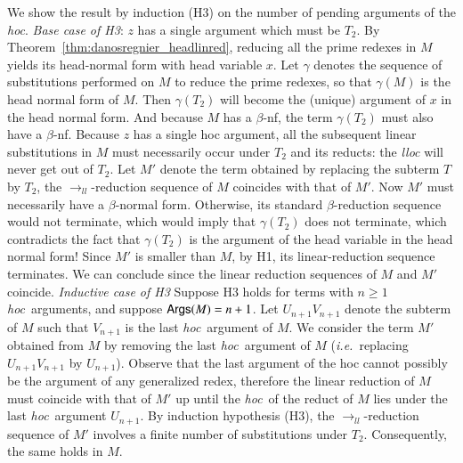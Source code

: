\documentclass{elsarticle}
\makeatletter
\theoremstyle{plain}
\theoremstyle{definition}
\renewcommand\ie{{\it i.e.\@\xspace}}
\newcommand{\llred}{\rightarrow_{ll}}
\newcommand{\hoc}{\emph{hoc}}
\makeatother
\begin{document}
    We show the result by induction (H3) on the number of pending arguments of the \emph{hoc}.
    \emph{Base case of H3}: $z$ has a single argument which must be $T_2$.
    By Theorem~\ref{thm:danosregnier_headlinred}, reducing all the prime redexes in $M$ yields its head-normal form
    with head variable $x$.
    Let $\gamma$ denotes the sequence of substitutions performed on $M$ to reduce the prime redexes, so that $\gamma(M)$ is the head normal form of $M$.  Then $\gamma(T_2)$ will become the (unique) argument of $x$ in the head normal form. And because $M$ has a $\beta$-nf, the term $\gamma(T_2)$ must also have a $\beta$-nf.
    Because $z$ has a single hoc argument, all the subsequent linear substitutions in $M$ must necessarily occur under $T_2$ and its reducts: the \emph{lloc} will never get out of $T_2$.
    Let $M'$ denote the term obtained by replacing
    the subterm $T$ by $T_2$, the $\llred$-reduction sequence of $M$ coincides with that of $M'$.
    Now $M'$ must necessarily have a $\beta$-normal form. Otherwise, its standard $\beta$-reduction sequence would not terminate, which would imply that $\gamma(T_2)$ does not terminate, which contradicts the fact that $\gamma(T_2)$ is the argument of the head variable in the head normal form!
    Since $M'$ is smaller than $M$, by H1, its linear-reduction sequence terminates. We can conclude since the linear reduction sequences of $M$ and $M'$ coincide.
     \emph{Inductive case of H3} Suppose H3  holds for terms with $n \geq 1$ \hoc\ arguments, and suppose ${\sf Args}(M) = n+1$.
    Let $U_{n+1} V_{n+1}$ denote the subterm of $M$ such that $V_{n+1}$ is the last \hoc\ argument of $M$. We consider the term $M'$ obtained from $M$ by removing the last \hoc\ argument of $M$ (\ie~replacing $U_{n+1} V_{n+1}$ by $U_{n+1}$).
    Observe that the last argument of the hoc cannot possibly be the argument of any generalized redex, therefore the linear reduction of $M$ must  coincide with that of $M'$ up until the \hoc\ of the reduct of $M$ lies under the last \hoc\ argument $U_{n+1}$.
%
    By induction hypothesis (H3), the $\llred$-reduction sequence of $M'$ involves a finite number of substitutions under $T_2$. Consequently, the same holds in $M$.
\end{document}
